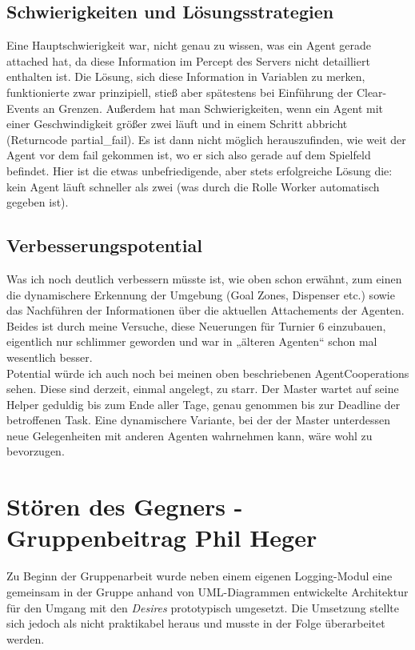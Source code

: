\documentclass[runningheads]{llncs}
\begin{document}
\subsection{Schwierigkeiten und Lösungsstrategien}
Eine Hauptschwierigkeit war, nicht genau zu wissen, was ein Agent gerade attached hat, da diese Information im Percept des Servers nicht detailliert enthalten ist. Die Lösung, sich diese Information in Variablen zu merken, funktionierte zwar prinzipiell, stieß aber spätestens bei Einführung der Clear-Events an Grenzen. Außerdem hat man Schwierigkeiten, wenn ein Agent mit einer Geschwindigkeit größer zwei läuft und in einem Schritt abbricht (Returncode partial\_fail). Es ist dann nicht möglich herauszufinden, wie weit der Agent vor dem fail gekommen ist, wo er sich also gerade auf dem Spielfeld befindet. Hier ist die etwas unbefriedigende, aber stets erfolgreiche Lösung die: kein Agent läuft schneller als zwei (was durch die Rolle Worker automatisch gegeben ist). 

\subsection{Verbesserungspotential}
Was ich noch deutlich verbessern müsste ist, wie oben schon erwähnt, zum einen die dynamischere Erkennung der Umgebung (Goal Zones, Dispenser etc.) sowie das Nachführen der Informationen über die aktuellen Attachements der Agenten. Beides ist durch meine Versuche, diese Neuerungen für Turnier 6 einzubauen, eigentlich nur schlimmer geworden und war in „älteren Agenten“ schon mal wesentlich besser.\\

Potential würde ich auch noch bei meinen oben beschriebenen AgentCooperations sehen. Diese sind derzeit, einmal angelegt, zu starr. Der Master wartet auf seine Helper geduldig bis zum Ende aller Tage, genau genommen bis zur Deadline der betroffenen Task. Eine dynamischere Variante, bei der der Master unterdessen neue Gelegenheiten mit anderen Agenten wahrnehmen kann, wäre wohl zu bevorzugen.  

\section{Stören des Gegners - Gruppenbeitrag Phil Heger}
Zu Beginn der Gruppenarbeit wurde neben einem eigenen Logging-Modul eine gemeinsam in der Gruppe anhand von UML-Diagrammen entwickelte Architektur für den Umgang mit den \textit{Desires} prototypisch umgesetzt. Die Umsetzung stellte sich jedoch als nicht praktikabel heraus und musste in der Folge überarbeitet werden. 
\end{document}
